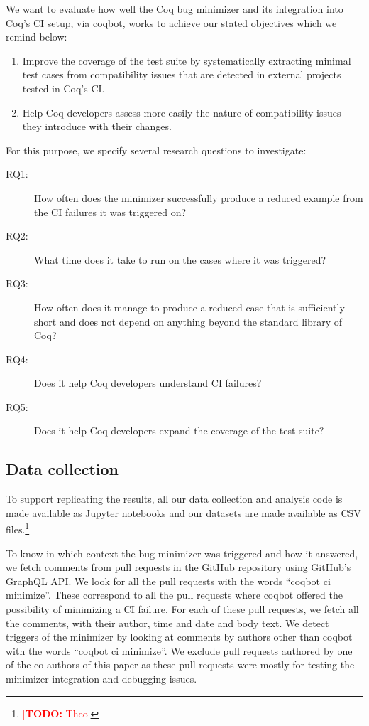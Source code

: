 \documentclass[sigplan,10pt,review,anonymous]{acmart}
\makeatletter
\newcommand{\todo}[1]{%
\@latex@warning{TODO: \detokenize{#1} on page \thepage}%
\textcolor{red}{[\textbf{TODO:} #1]}}%
\makeatother
\begin{document}
We want to evaluate how well the Coq bug minimizer and its integration into Coq's CI setup, via coqbot, works to achieve our stated objectives which we remind below:

\begin{enumerate}
\item Improve the coverage of the test suite by systematically extracting minimal test cases from compatibility issues that are detected in external projects tested in Coq's CI.
\item Help Coq developers assess more easily the nature of compatibility issues they introduce with their changes.
\end{enumerate}

For this purpose, we specify several research questions to investigate:

\begin{description}
\item[RQ1:] How often does the minimizer successfully produce a reduced example from the CI failures it was triggered on?
\item[RQ2:] What time does it take to run on the cases where it was triggered?
\item[RQ3:] How often does it manage to produce a reduced case that is sufficiently short and does not depend on anything beyond the standard library of Coq?
\item[RQ4:] Does it help Coq developers understand CI failures?
\item[RQ5:] Does it help Coq developers expand the coverage of the test suite?
\end{description}

\subsection{Data collection}

To support replicating the results, all our data collection and analysis code is made available as Jupyter notebooks and our datasets are made available as CSV files.\footnote{\todo{Theo}}

To know in which context the bug minimizer was triggered and how it answered, we fetch comments from pull requests in the GitHub repository using GitHub's GraphQL API.
%
We look for all the pull requests with the words ``coqbot ci minimize''.
%
These correspond to all the pull requests where coqbot offered the possibility of minimizing a CI failure. For each of these pull requests, we fetch all the comments, with their author, time and date and body text.
%
We detect triggers of the minimizer by looking at comments by authors other than coqbot with the words ``coqbot ci minimize''.
%
We exclude pull requests authored by one of the co-authors of this paper as these pull requests were mostly for testing the minimizer integration and debugging issues.
\end{document}
